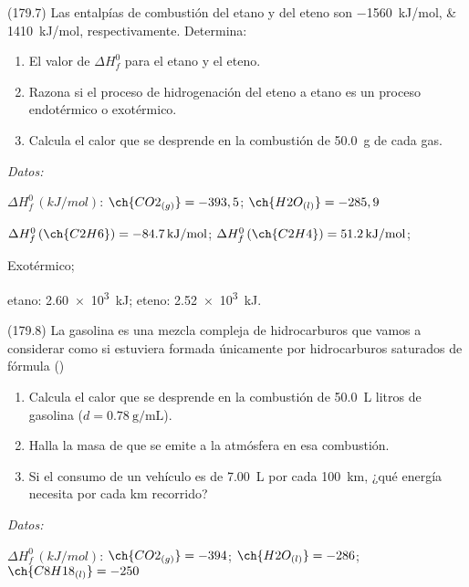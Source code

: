 \documentclass[10pt,a5paper,twoside]{article}
\newenvironment{gexdatos}{
      \vspace{4pt}
      \noindent\small\textit{Datos:}
    }{\vspace{5pt}}
\begin{document}
  \begin{exercise}[
      tags    = {},
      topics  = {química, termodinámica, termoquímica},
      source  = {FQ 1B MGH 2016, p179, e7},
    ]
    (179.7) Las entalpías de combustión del etano y del eteno son
    \SIlist{-1560;1410}{kJ/mol}, respectivamente. Determina:
    \begin{enumerate}
      \item El valor de \( \Delta H^0_f \) para el etano y el eteno.
      \item Razona si el proceso de hidrogenación del eteno a etano
      es un proceso endotérmico o exotérmico.
      \item Calcula el calor que se desprende en la combustión de
      \SI{50.0}{\gram} de cada gas.
    \end{enumerate}

    \begin{gexdatos}
      \( \Delta H^0_f\,(\si{kJ/mol}) \): \( \ch{CO2_{(g)}} = -393,5 \); \( \ch{H2O_{(l)}} = -285,9 \)
    \end{gexdatos}
  \end{exercise}

  \begin{solution}
    \begin{enumerate*}
      \item \( \Delta H^0_f\,(\ch{C2H6})= \SI{-84,7}{kJ/mol} \); \( \Delta H^0_f\,(\ch{C2H4}) = \SI{51.2}{kJ/mol} \); \item Exotérmico; \item etano: \SI{2.60e3}{kJ}; eteno: \SI{2.52e3}{kJ}.
    \end{enumerate*}
  \end{solution}




  \begin{exercise}[
      tags    = {},
      topics  = {química, termodinámica, termoquímica},
      source  = {FQ 1B MGH 2016, p179, e8},
    ]
    (179.8) La gasolina es una mezcla compleja de hidrocarburos que
    vamos a considerar como si estuviera formada únicamente
    por hidrocarburos saturados de fórmula ()
    \begin{enumerate}
      \item Calcula el calor que se desprende en la combustión de
      \SI{50.0}{\liter} litros de gasolina (\( d = \SI{0.78}{\gram\per\milli\liter} \)).
      \item Halla la masa de  que se emite a la atmósfera en esa
      combustión.
      \item Si el consumo de un vehículo es de \SI{7.00}{\liter} por cada
      \SI{100}{km}, ¿qué energía necesita por cada \si{km} recorrido?
    \end{enumerate}

    \begin{gexdatos}
      \( \Delta H^0_f\,(\si{kJ/mol}) \): \( \ch{CO2_{(g)}} = -394 \); \( \ch{H2O_{(l)}} = -286 \); \( \ch{C8H18_{(l)}} = -250 \)
    \end{gexdatos}
  \end{exercise}
\end{document}
